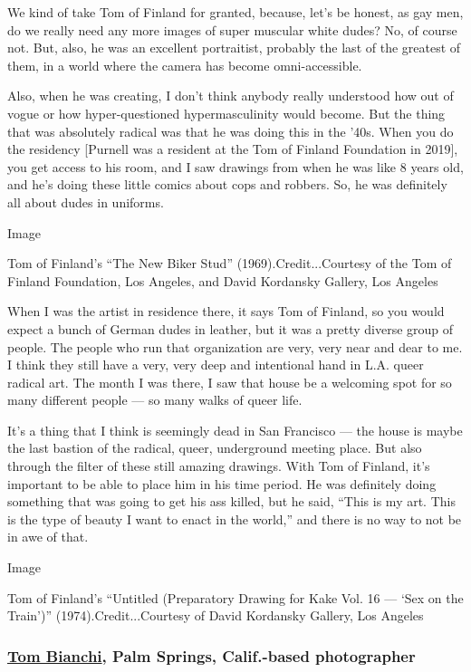 We kind of take Tom of Finland for granted, because, let's be honest, as
gay men, do we really need any more images of super muscular white
dudes? No, of course not. But, also, he was an excellent portraitist,
probably the last of the greatest of them, in a world where the camera
has become omni-accessible.

Also, when he was creating, I don't think anybody really understood how
out of vogue or how hyper-questioned hypermasculinity would become. But
the thing that was absolutely radical was that he was doing this in the
'40s. When you do the residency {[}Purnell was a resident at the Tom of
Finland Foundation in 2019{]}, you get access to his room, and I saw
drawings from when he was like 8 years old, and he's doing these little
comics about cops and robbers. So, he was definitely all about dudes in
uniforms.

Image

Tom of Finland's ``The New Biker Stud'' (1969).Credit...Courtesy of the
Tom of Finland Foundation, Los Angeles, and David Kordansky Gallery, Los
Angeles

When I was the artist in residence there, it says Tom of Finland, so you
would expect a bunch of German dudes in leather, but it was a pretty
diverse group of people. The people who run that organization are very,
very near and dear to me. I think they still have a very, very deep and
intentional hand in L.A. queer radical art. The month I was there, I saw
that house be a welcoming spot for so many different people --- so many
walks of queer life.

It's a thing that I think is seemingly dead in San Francisco --- the
house is maybe the last bastion of the radical, queer, underground
meeting place. But also through the filter of these still amazing
drawings. With Tom of Finland, it's important to be able to place him in
his time period. He was definitely doing something that was going to get
his ass killed, but he said, ``This is my art. This is the type of
beauty I want to enact in the world,'' and there is no way to not be in
awe of that.

Image

Tom of Finland's ``Untitled (Preparatory Drawing for Kake Vol. 16 ---
`Sex on the Train')'' (1974).Credit...Courtesy of David Kordansky
Gallery, Los Angeles

\hypertarget{tom-bianchi-palm-springs-calif-based-photographer}{%
\subsubsection{\texorpdfstring{\textbf{\href{https://tmagazine.blogs.nytimes3xbfgragh.onion/2013/05/02/feeling-for-fire-island-memories/}{Tom
Bianchi}, Palm Springs, Calif.-based
photographer}}{Tom Bianchi, Palm Springs, Calif.-based photographer}}\label{tom-bianchi-palm-springs-calif-based-photographer}}

